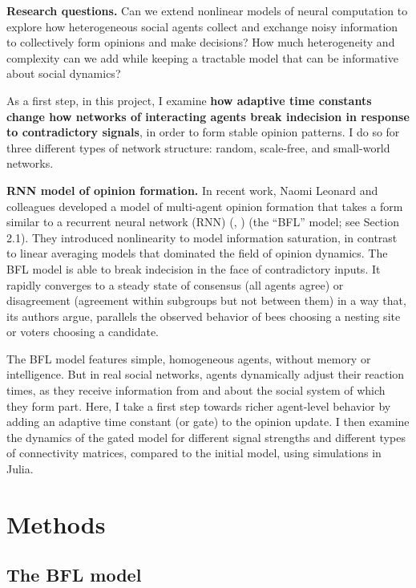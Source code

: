\documentclass[]{article}
\begin{document}
\textbf{Research questions.} Can we extend nonlinear models of neural computation to explore how heterogeneous social agents collect and exchange noisy information to collectively form opinions and make decisions? How much heterogeneity and complexity can we add while keeping a tractable model that can be informative about social dynamics?

As a first step, in this project, I examine \textbf{how adaptive time constants change how networks of interacting agents break indecision in response to contradictory signals}, in order to form stable opinion patterns. I do so for three different types of network structure: random, scale-free, and small-world networks.

\textbf{RNN model of opinion formation.} In recent work, Naomi Leonard and colleagues developed a model of multi-agent opinion formation that takes a form similar to a recurrent neural network (RNN) (\cite{bizyaevaNonlinearOpinionDynamics2022}, \cite{leonardFastFlexibleMultiAgent2024}) (the “BFL” model; see Section 2.1). They introduced nonlinearity to model information saturation, in contrast to linear averaging models that dominated the field of opinion dynamics. The BFL model is able to break indecision in the face of contradictory inputs. It rapidly converges to a steady state of consensus (all agents agree) or disagreement (agreement within subgroups but not between them) in a way that, its authors argue, parallels the observed behavior of bees choosing a nesting site or voters choosing a candidate.

The BFL model features simple, homogeneous agents, without memory or intelligence. But in real social networks, agents dynamically adjust their reaction times, as they receive information from and about the social system of which they form part. Here, I take a first step towards richer agent-level behavior by adding an adaptive time constant (or gate) to the opinion update. I then examine the dynamics of the gated model for different signal strengths and different types of connectivity matrices, compared to the initial model, using simulations in Julia.

\section{Methods}
\subsection{The BFL model}
\end{document}
